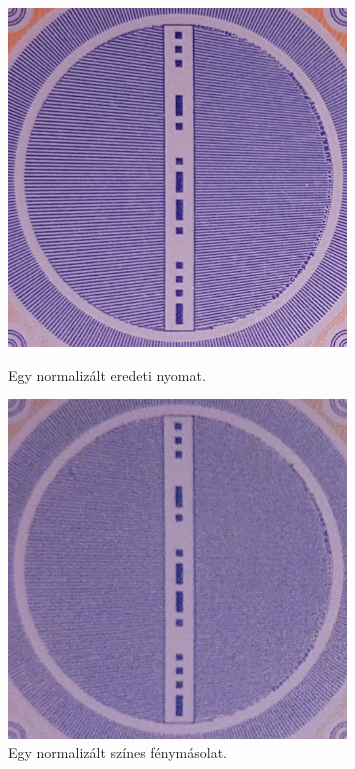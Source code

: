 \begin{figure}[h]{}
	
	\begin{minipage}[c]{0.5\linewidth}
		\centering
		\includegraphics[width=0.8\textwidth]{img/normalized-eredeti-pelda.png}
		\captionsetup{justification=centering}
		\caption{Egy normalizált eredeti nyomat.}
		\label{fig:normalized-eredeti.pelda}
		
	\end{minipage}\hfill
	\begin{minipage}[c]{0.5\linewidth}
		\centering
		\includegraphics[width=0.8\textwidth]{img/normalized-copy-pelda.png}
		\captionsetup{justification=centering}
		\caption{Egy normalizált színes fénymásolat.}
		\label{fig:normalized-copy.pelda}
		
	\end{minipage}
	
\end{figure}

